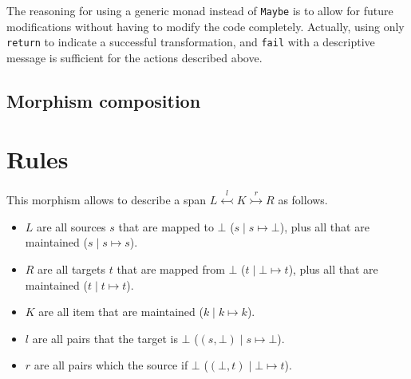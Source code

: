 \documentclass[a4paper]{report}
\begin{document}
The reasoning for using a generic monad instead of \texttt{Maybe} is to allow for future modifications without having to modify the code completely. Actually, using only \texttt{return} to indicate a successful transformation, and \texttt{fail} with a descriptive message is sufficient for the actions described above.

\subsection{Morphism composition}


\section{Rules}
This morphism allows to describe a span $L \overset{l}{\leftarrowtail} K \overset{r}{\rightarrowtail} R$ as follows.

\begin{itemize}
	\item $L$ are all sources $s$ that are mapped to $\bot$ ($s \mid s \mapsto \bot$), plus all that are maintained ($s \mid s \mapsto s$).
	\item $R$ are all targets $t$ that are mapped from $\bot$ ($t \mid \bot \mapsto t$), plus all that are maintained ($t \mid t \mapsto t$).
	\item $K$ are all item that are maintained ($k \mid k \mapsto k$).
	\item $l$ are all pairs that the target is $\bot$ ($(s, \bot) \mid s \mapsto \bot$).
	\item $r$ are all pairs which the source if $\bot$ ($(\bot, t) \mid \bot \mapsto t$).
\end{itemize}
\end{document}
